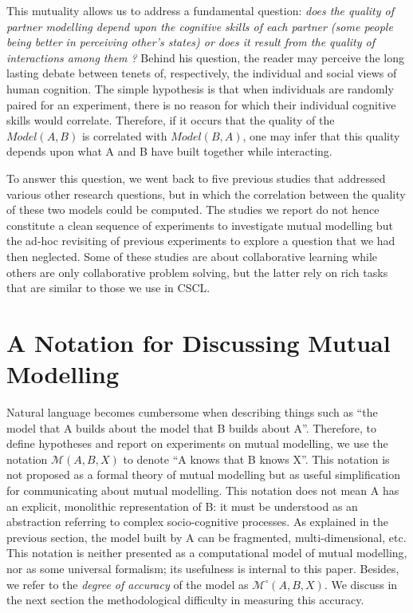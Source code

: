 \documentclass[natbib]{svjour3}
\newcommand{\A}{A\xspace}
\newcommand{\B}{B\xspace}
\newcommand{\model}[3]{{$\mathcal{M}(#1, #2, #3)$}}
\newcommand{\Model}[3]{{$\mathcal{M}^{\circ}(#1, #2, #3)$}}
\begin{document}
This mutuality allows us to address a fundamental question: \emph{does the
quality of partner modelling depend upon the cognitive skills of each partner
(some people being better in perceiving other's states) or does it result from
the quality of interactions among them ?} Behind his question, the reader may
perceive the long lasting debate between tenets of, respectively, the individual
and social views of human cognition.  The simple hypothesis is that when
individuals are randomly paired for an experiment, there is no reason for which
their individual cognitive skills would correlate. Therefore, if it occurs that
the quality of the $Model(A,B)$ is correlated with $Model(B,A)$, one may infer
that this quality depends upon what \A and \B have built together while
interacting.

To answer this question, we went back to five previous studies that addressed
various other research questions, but in which the correlation between the
quality of these two models could be computed.  The studies we report do not hence
constitute a clean sequence of experiments to investigate mutual modelling but
the ad-hoc revisiting of previous experiments to explore a question that we had
then neglected. Some of these studies are about collaborative learning while
others are only collaborative problem solving, but the latter rely on rich tasks
that are similar to those we use in CSCL.

\section{A Notation for Discussing Mutual Modelling }

Natural language becomes cumbersome when describing things such as ``the model
that \A builds about the model that \B builds about A''. Therefore, to define
hypotheses and report on experiments on mutual modelling, we use  the notation
\model{A}{B}{X} to denote ``\A knows that \B knows X''. This  notation is not
proposed as a formal theory of mutual modelling but as useful simplification for
communicating about mutual modelling. This notation does not mean \A has an
explicit, monolithic representation of \B: it must be understood as an
abstraction referring to complex socio-cognitive processes.  As explained in the
previous section, the model built by \A can be fragmented, multi-dimensional, etc. This notation
is neither presented as a computational model of mutual modelling, nor as some
universal formalism; its usefulness is internal to this paper.  Besides, we
refer to the \emph{degree of accuracy} of the model as \Model{A}{B}{X}. We
discuss in the next section the methodological difficulty in measuring this
accuracy.
\end{document}
